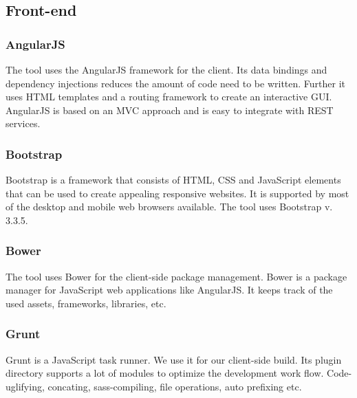 \subsection{Front-end}

\subsubsection{AngularJS}
The tool uses the AngularJS framework for the client. Its data bindings and dependency injections reduces the amount of code need to be written. Further it uses HTML templates and a routing framework to create an interactive GUI. AngularJS is based on an MVC approach and is easy to integrate with REST services.\cite{angular}\par


\subsubsection{Bootstrap}
Bootstrap is a framework that consists of HTML, CSS and JavaScript elements that can be used to create appealing responsive websites. It is supported by most of the desktop and mobile web browsers available. The tool uses Bootstrap v. 3.3.5. \cite{bootstrap}

\subsubsection{Bower}
The tool uses Bower for the client-side package management. Bower is a package manager for JavaScript web applications like AngularJS. It keeps track of the used assets, frameworks, libraries, etc. \cite{bower}  

\subsubsection{Grunt}
Grunt is a JavaScript task runner. We use it for our client-side build. Its plugin directory supports a lot of modules to optimize the development work flow. Code-uglifying, concating, sass-compiling, file operations, auto prefixing etc. \cite{grunt} 
